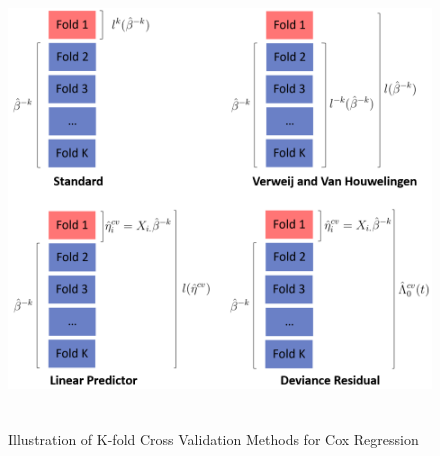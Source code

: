 
\begin{figure}
  \centering
		\includegraphics[height= 12cm ]{./figures/figure_1_new.png}
   \caption{Illustration of K-fold Cross Validation Methods for Cox Regression}
\end{figure}	

